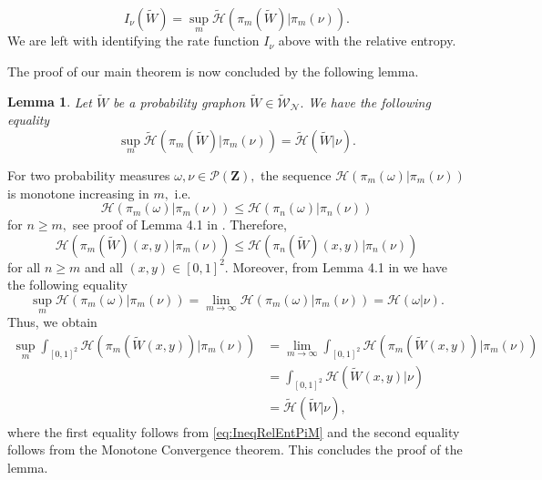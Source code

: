 \documentclass[12pt,twoside,a4paper]{article}
\newtheorem{lemma}[theorem]{Lemma}
\newcommand{\Space}{\mathbf{Z}}
\begin{document}
\begin{equation}
    I_\nu(\widetilde{W})=\sup_m \widetilde{\mathcal{H}}(\pi_m(\widetilde{W})| \pi_m(\nu)).
\end{equation}
We are left with identifying the rate function $I_\nu$ above with the relative entropy.

The proof of our main theorem is now concluded by the following lemma.
\begin{lemma}\label{Lemm:EntropyDawsonGart}
 Let $\widetilde{W}$ be a probability graphon $\widetilde{W}\in \widetilde{\mathcal{W}}_{\mathcal{N}}.$ We have the following equality 
    \begin{equation*}
        \sup_m \widetilde{\mathcal{H}}(\pi_m(\widetilde{W})| \pi_m(\nu))=\widetilde{\mathcal{H}}(\widetilde{W}| \nu).
    \end{equation*}
\end{lemma}
\proof
For two probability measures $\omega,\nu\in \mathcal{P}(\Space),$ the sequence $\mathcal{H}(\pi_m(\omega)| \pi_m(\nu))$ is monotone increasing in $m,$ i.e.\ 
\begin{equation*}
  \mathcal{H}(\pi_m(\omega)| \pi_m(\nu))\leq \mathcal{H}(\pi_n(\omega)| \pi_n(\nu))
\end{equation*}
for $n\geq m,$ see proof of Lemma 4.1 in \cite{baldasso2023proof}. Therefore, \begin{equation}\label{eq:IneqRelEntPiM}
\mathcal{H}(\pi_m(\widetilde{W})(x,y)| \pi_m(\nu))\leq \mathcal{H}(\pi_n(\widetilde{W})(x,y)| \pi_n(\nu))
\end{equation} for all $n\geq m$ and all $(x,y)\in [0,1]^2.$ Moreover, from Lemma 4.1 in \cite{baldasso2023proof} we have the following equality
\begin{equation*}
    \sup_m \mathcal{H}(\pi_m(\omega)| \pi_m(\nu))=\lim_{m\rightarrow \infty} \mathcal{H}(\pi_m(\omega)| \pi_m(\nu))=\mathcal{H}(\omega| \nu).
\end{equation*}
Thus, we obtain 
\begin{equation*}
\begin{aligned}
\sup_{m} \int_{[0,1]^2}  \mathcal{H}(\pi_m(\widetilde{W}(x,y))| \pi_m(\nu))  &=\lim_{m\rightarrow\infty} \int_{[0,1]^2}  \mathcal{H}(\pi_m(\widetilde{W}(x,y))| \pi_m(\nu))\\&=
\int_{[0,1]^2} \mathcal{H}(\widetilde{W}(x,y)| \nu)\\& =\widetilde{\mathcal{H}}(\widetilde{W}| \nu),
\end{aligned}
\end{equation*}
where the first equality follows from \eqref{eq:IneqRelEntPiM} and the second equality follows from the Monotone Convergence theorem. This concludes the proof of the lemma.
\endproof
\end{document}
